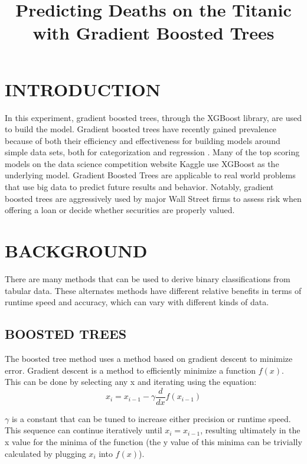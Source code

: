 \documentclass[12pt]{article}
\title{Predicting Deaths on the Titanic with Gradient Boosted Trees}
\author{\sc{Ethan Reese}}
\begin{document}
      \maketitle

    \section{INTRODUCTION}
     In this experiment, gradient boosted trees, through the XGBoost library, are used to build the model. Gradient boosted trees have recently gained prevalence because of both their efficiency and effectiveness for building models around simple data sets, both for categorization and regression \cite{one}. Many of the top scoring models on the data science competition website Kaggle use XGBoost as the underlying model. Gradient Boosted Trees are applicable to real world problems that use big data to predict future results and behavior. Notably, gradient boosted trees are aggressively used by major Wall Street firms to assess risk when offering a loan or decide whether securities are properly valued.

     \section{BACKGROUND}
     There are many methods that can be used to derive binary classifications from tabular data. These alternates methods have different relative benefits in terms of runtime speed and accuracy, which can vary with different kinds of data.

     \subsection{BOOSTED TREES}
     The boosted tree method uses a method based on gradient descent to minimize error. Gradient descent is a method to efficiently minimize a function $f(x)$. This can be done by selecting any x and iterating using the equation:
    \begin{equation}
      x_i = x_{i-1} - \gamma\frac{d}{dx}f(x_{i-1})
    \end{equation}

    $ \gamma $ is a constant that can be tuned to increase either precision or runtime speed. This sequence can continue iteratively until $x_i = x_{i-1}$, resulting ultimately in the x value for the minima of the function (the y value of this minima can be trivially calculated by plugging $x_i$ into $f(x)$).
\end{document}

